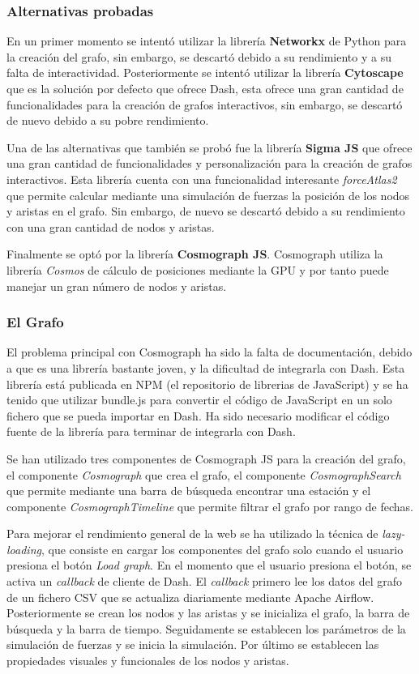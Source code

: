 \subsubsection*{Alternativas probadas}
En un primer momento se intentó utilizar la librería \textbf{Networkx} de Python para la creación del grafo, sin embargo, se descartó debido a su rendimiento y a su falta de interactividad. Posteriormente se intentó utilizar la librería \textbf{Cytoscape} que es la solución por defecto que ofrece Dash, esta ofrece una gran cantidad de funcionalidades para la creación de grafos interactivos, sin embargo, se descartó de nuevo debido a su pobre rendimiento.

Una de las alternativas que también se probó fue la librería \textbf{Sigma JS} que ofrece una gran cantidad de funcionalidades y personalización para la creación de grafos interactivos. Esta librería cuenta con una funcionalidad interesante \textit{forceAtlas2} que permite calcular mediante una simulación de fuerzas la posición de los nodos y aristas en el grafo. Sin embargo, de nuevo se descartó debido a su rendimiento con una gran cantidad de nodos y aristas.

Finalmente se optó por la librería \textbf{Cosmograph JS}. Cosmograph utiliza la librería \textit{Cosmos} de cálculo de posiciones mediante la GPU y por tanto puede manejar un gran número de nodos y aristas.

\subsubsection*{El Grafo}
El problema principal con Cosmograph ha sido la falta de documentación, debido a que es una librería bastante joven, y la dificultad de integrarla con Dash. Esta librería está publicada en NPM (el repositorio de librerias de JavaScript) y se ha tenido que utilizar bundle.js para convertir el código de JavaScript en un solo fichero que se pueda importar en Dash. Ha sido necesario modificar el código fuente de la librería para terminar de integrarla con Dash.

Se han utilizado tres componentes de Cosmograph JS para la creación del grafo, el componente \textit{Cosmograph} que crea el grafo, el componente \textit{CosmographSearch} que permite mediante una barra de búsqueda encontrar una estación y el componente \textit{CosmographTimeline} que permite filtrar el grafo por rango de fechas.

Para mejorar el rendimiento general de la web se ha utilizado la técnica de \textit{lazy-loading}, que consiste en cargar los componentes del grafo solo cuando el usuario presiona el botón \textit{Load graph}. En el momento que el usuario presiona el botón, se activa un \textit{callback} de cliente de Dash. El \textit{callback} primero lee los datos del grafo de un fichero CSV que se actualiza diariamente mediante Apache Airflow. Posteriormente se crean los nodos y las aristas y se inicializa el grafo, la barra de búsqueda y la barra de tiempo. Seguidamente se establecen los parámetros de la simulación de fuerzas y se inicia la simulación. Por último se establecen las propiedades visuales y funcionales de los nodos y aristas.

